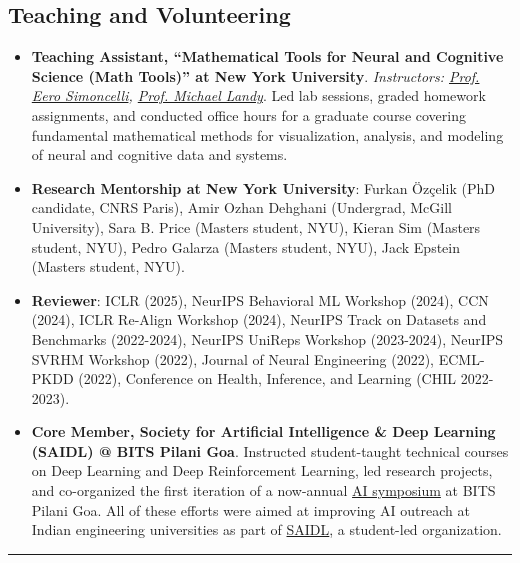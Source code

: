 \documentclass[10pt,letterpaper]{article}
\begin{document}
\subsection*{\Large Teaching and Volunteering}
\begin{itemize}[leftmargin=1em,itemsep=0.3em]
    \item \textbf{Teaching Assistant, ``Mathematical Tools for Neural and Cognitive Science (Math Tools)'' at New York University}. \textit{Instructors: \href{https://www.cns.nyu.edu/~eero/}{Prof. Eero Simoncelli}, \href{https://as.nyu.edu/faculty/michael-s-landy.html}{Prof. Michael Landy}}. Led lab sessions, graded homework assignments, and conducted office hours for a graduate course covering fundamental mathematical methods for visualization, analysis, and modeling of neural and cognitive data and systems.

    \item \textbf{Research Mentorship at New York University}: Furkan Özçelik (PhD candidate, CNRS Paris), Amir Ozhan Dehghani (Undergrad, McGill University), Sara B. Price (Masters student, NYU), Kieran Sim (Masters student, NYU), Pedro Galarza (Masters student, NYU), Jack Epstein (Masters student, NYU).

    \item \textbf{Reviewer}: ICLR (2025), NeurIPS Behavioral ML Workshop (2024), CCN (2024), ICLR Re-Align Workshop (2024), NeurIPS Track on Datasets and Benchmarks (2022-2024), NeurIPS UniReps Workshop (2023-2024), NeurIPS SVRHM Workshop (2022), Journal of Neural Engineering (2022), ECML-PKDD (2022), Conference on Health, Inference, and Learning (CHIL 2022-2023).

    \item \textbf{Core Member, Society for Artificial Intelligence \& Deep Learning (SAIDL) @ BITS Pilani Goa}. Instructed student-taught technical courses on Deep Learning and Deep Reinforcement Learning, led research projects, and co-organized the first iteration of a now-annual \href{https://sites.google.com/view/aisymposium2020}{AI symposium} at BITS Pilani Goa. All of these efforts were aimed at improving AI outreach at Indian engineering universities as part of \href{https://www.saidl.in/}{SAIDL}, a student-led organization.
 
\end{itemize}

\hrule
\vspace{-1em}
\end{document}
